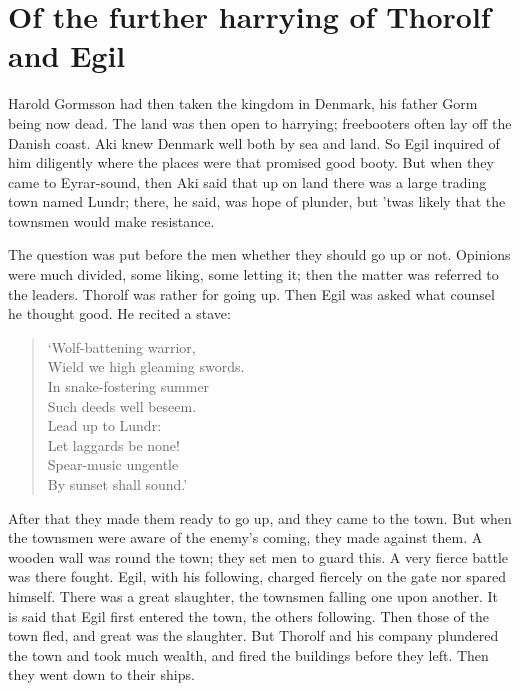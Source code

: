 \chapter{Of the further harrying of Thorolf and Egil}

Harold Gormsson had then taken the kingdom in Denmark, his father Gorm being now dead. The land was then open to harrying; freebooters often lay off the Danish coast. Aki knew Denmark well both by sea and land. So Egil inquired of him diligently where the places were that promised good booty. But when they came to Eyrar-sound, then Aki said that up on land there was a large trading town named Lundr; there, he said, was hope of plunder, but 'twas likely that the townsmen would make resistance.

The question was put before the men whether they should go up or not. Opinions were much divided, some liking, some letting it; then the matter was referred to the leaders. Thorolf was rather for going up. Then Egil was asked what counsel he thought good. He recited a stave:

\begin{verse}
`Wolf-battening warrior, \\
Wield we high gleaming swords. \\
In snake-fostering summer \\
Such deeds well beseem. \\
Lead up to Lundr: \\
Let laggards be none! \\
Spear-music ungentle \\
By sunset shall sound.' \\
\end{verse}

After that they made them ready to go up, and they came to the town. But when the townsmen were aware of the enemy's coming, they made against them. A wooden wall was round the town; they set men to guard this. A very fierce battle was there fought. Egil, with his following, charged fiercely on the gate nor spared himself. There was a great slaughter, the townsmen falling one upon another. It is said that Egil first entered the town, the others following. Then those of the town fled, and great was the slaughter. But Thorolf and his company plundered the town and took much wealth, and fired the buildings before they left. Then they went down to their ships.
